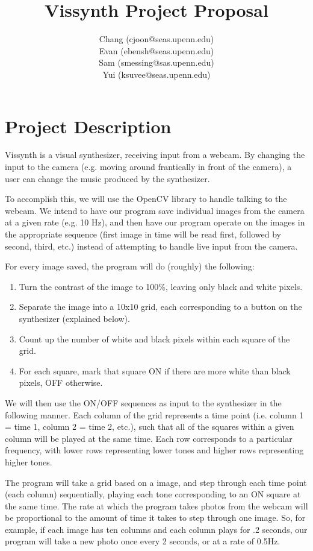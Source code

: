 \documentclass{article}
\title{Vissynth Project Proposal}
\author{Chang (cjoon@seas.upenn.edu) \\ Evan (ebensh@seas.upenn.edu) \\ Sam (smessing@sas.upenn.edu) \\ Yui (ksuvee@seas.upenn.edu)}
\begin{document}
\maketitle

\section{Project Description} %
\label{sec:project_description}

Vissynth is a visual synthesizer, receiving input from a webcam.
By changing the input to the camera (e.g. moving around
frantically in front of the camera), a user can change the music
produced by the synthesizer.

To accomplish this, we will use the OpenCV library to handle
talking to the webcam. We intend to have our program save
individual images from the camera at a given rate (e.g. 10 Hz),
and then have our program operate on the images in the
appropriate sequence (first image in time will be read first,
followed by second, third, etc.) instead of attempting to handle
live input from the camera.

For every image saved, the program will do (roughly) the
following:

\begin{enumerate}
  \item Turn the contrast of the image to 100\%, leaving only black and white pixels.
  \item Separate the image into a 10x10 grid, each corresponding to a button on the synthesizer (explained below).
  \item Count up the number of white and black pixels within each square of the grid.
  \item For each square, mark that square ON if there are more white than black pixels, OFF otherwise.
\end{enumerate}

We will then use the ON/OFF sequences as input to the synthesizer
in the following manner. Each column of the grid represents a
time point (i.e. column 1 = time 1, column 2 = time 2, etc.),
such that all of the squares within a given column will be played
at the same time. Each row corresponds to a particular frequency,
with lower rows representing lower tones and higher rows
representing higher tones.

The program will take a grid based on a image, and step through
each time point (each column) sequentially, playing each tone
corresponding to an ON square at the same time. The rate at which
the program takes photos from the webcam will be proportional to
the amount of time it takes to step through one image. So, for
example, if each image has ten columns and each column plays for
.2 seconds, our program will take a new photo once every 2
seconds, or at a rate of 0.5Hz.
\end{document}

